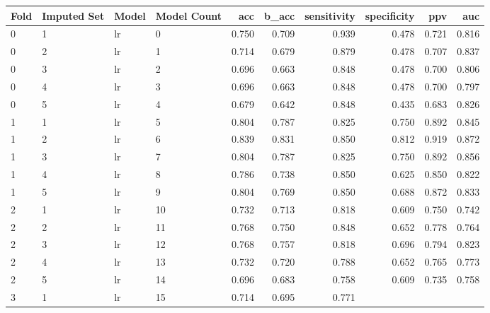 \begin{table}[ht]
\centering
\begin{adjustbox}{width=\textwidth}
\begin{tabular}{llllrrrrrr}
Fold & Imputed Set & Model & Model Count &   acc &  b\_acc &  sensitivity &  
specificity &   ppv &   auc \\ \hline
   0 &           1 &    lr &           0 & 0.750 &  0.709 &        0.939 &       
 0.478 & 0.721 & 0.816 \\
   0 &           2 &    lr &           1 & 0.714 &  0.679 &        0.879 &       
 0.478 & 0.707 & 0.837 \\
   0 &           3 &    lr &           2 & 0.696 &  0.663 &        0.848 &       
 0.478 & 0.700 & 0.806 \\
   0 &           4 &    lr &           3 & 0.696 &  0.663 &        0.848 &       
 0.478 & 0.700 & 0.797 \\
   0 &           5 &    lr &           4 & 0.679 &  0.642 &        0.848 &       
 0.435 & 0.683 & 0.826 \\
   1 &           1 &    lr &           5 & 0.804 &  0.787 &        0.825 &       
 0.750 & 0.892 & 0.845 \\
   1 &           2 &    lr &           6 & 0.839 &  0.831 &        0.850 &       
 0.812 & 0.919 & 0.872 \\
   1 &           3 &    lr &           7 & 0.804 &  0.787 &        0.825 &       
 0.750 & 0.892 & 0.856 \\
   1 &           4 &    lr &           8 & 0.786 &  0.738 &        0.850 &       
 0.625 & 0.850 & 0.822 \\
   1 &           5 &    lr &           9 & 0.804 &  0.769 &        0.850 &       
 0.688 & 0.872 & 0.833 \\
   2 &           1 &    lr &          10 & 0.732 &  0.713 &        0.818 &       
 0.609 & 0.750 & 0.742 \\
   2 &           2 &    lr &          11 & 0.768 &  0.750 &        0.848 &       
 0.652 & 0.778 & 0.764 \\
   2 &           3 &    lr &          12 & 0.768 &  0.757 &        0.818 &       
 0.696 & 0.794 & 0.823 \\
   2 &           4 &    lr &          13 & 0.732 &  0.720 &        0.788 &       
 0.652 & 0.765 & 0.773 \\
   2 &           5 &    lr &          14 & 0.696 &  0.683 &        0.758 &       
 0.609 & 0.735 & 0.758 \\
   3 &           1 &    lr &          15 & 0.714 &  0.695 &        0.771 &       

\end{tabular}
\end{adjustbox}
\end{table}
